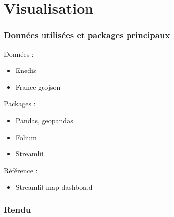 \documentclass[compress, red]{beamer}
\begin{document}
\section{Visualisation}

\begin{frame}
\frametitle{Données utilisées et packages principaux}

Données :
\begin{itemize}
\item Enedis
\item France-geojson
\end{itemize}

\vspace{0.5cm}

Packages :
\begin{itemize}
\item Pandas, geopandas 
\item Folium
\item Streamlit
\end{itemize}

\vspace{0.5cm}

Référence :
\begin{itemize}
\item Streamlit-map-dashboard
\end{itemize}

\end{frame}


\begin{frame}
\frametitle{Rendu}

\vspace{-0.5cm}

\begin{center}
\end{center}

\end{frame}
\end{document}
